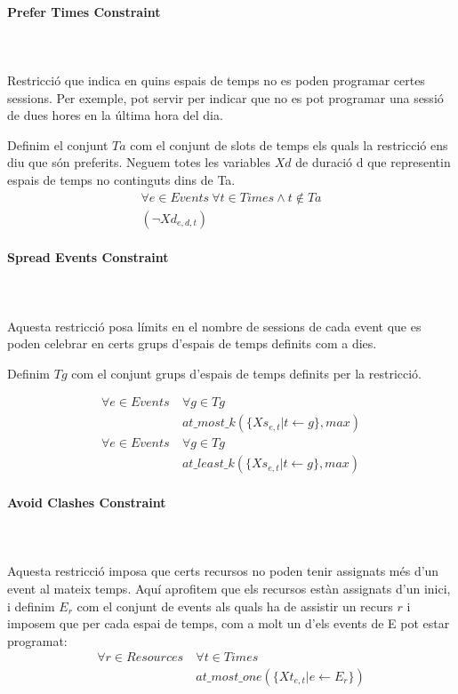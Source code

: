 \documentclass[11pt,a4paper,twoside]{report}
\begin{document}
  \paragraph*{Prefer Times Constraint} ~\\~\\
  
  Restricció que indica en quins espais de temps no es poden programar certes sessions. Per exemple, pot servir per indicar que no es pot programar una sessió de dues hores en la última hora del dia.

  Definim el conjunt $Ta$ com el conjunt de slots de temps els quals la restricció ens diu que són preferits. Neguem totes les variables $Xd$ de duració d que representin espais de temps no continguts dins de Ta.
  \begin{gather*}
    \forall e \in Events \ \forall t \in Times \land t \notin Ta \\ (\neg Xd_{e,d,t})
  \end{gather*}


  \paragraph*{Spread Events Constraint} ~\\~\\
  
  Aquesta restricció posa límits en el nombre de sessions de cada event que es poden celebrar en certs grups d'espais de temps definits com a dies.

  Definim $Tg$ com el conjunt grups d'espais de temps definits per la restricció.

    \begin{align*}
      \forall e \in Events \ &\forall g \in Tg \\
      &at\_most\_k(\{Xs_{e,t} | t \leftarrow g\}, max)\\
      \forall e \in Events \ &\forall g \in Tg \\
      &at\_least\_k(\{Xs_{e,t} | t \leftarrow g\}, max)
    \end{align*}


  \paragraph*{Avoid Clashes Constraint} ~\\~\\

    Aquesta restricció imposa que certs recursos no poden tenir assignats més d'un event al mateix temps. 
    Aquí aprofitem que els recursos estàn assignats d'un inici, i definim $E_r$ com el conjunt de events als quals ha de assistir un recurs $r$ i imposem que per cada espai de temps, com a molt un d'els events de E pot estar programat:
    \begin{align*}
      \forall r \in Resources \ & \forall t \in Times \\
      &at\_most\_one(\{Xt_{e,t} | e \leftarrow E_r\})
    \end{align*}
\end{document}
